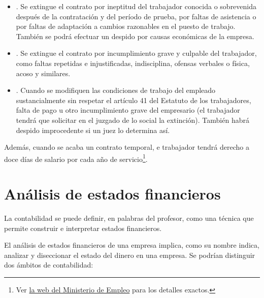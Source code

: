 \documentclass[nochap,palatino,shortheader]{apuntes}
\newcommand{\study}[1]{#1} \newcommand{\substudy}[1]{#1}
\begin{document}
\begin{itemize}
\item {}. Se extingue el contrato por ineptitud del trabajador conocida o sobrevenida después de la contratación y del período de prueba, por faltas de asistencia o por faltas de adaptación a cambios razonables en el puesto de trabajo. También se podrá efectuar un despido por causas económicas de la empresa.
\item {}. Se extingue el contrato por incumplimiento grave y culpable del trabajador, como faltas repetidas e injustificadas, indisciplina, ofensas verbales o física, acoso y similares.
\item {}. Cuando se modifiquen las condiciones de trabajo del empleado sustancialmente sin respetar el artículo 41 del Estatuto de los trabajadores, falta de pago u otro incumplimiento grave del empresario (el trabajador tendrá que solicitar en el juzgado de lo social la extinción). También habrá despido improcedente si un juez lo determina así.
\end{itemize}

Además, cuando se acaba un contrato temporal, e trabajador tendrá derecho a doce días de salario por cada año de servicio\footnote{Ver \href{http://www.empleo.gob.es/es/Guia/texto/guia_7/contenidos/guia_7_16_4.htm}{la web del Ministerio de Empleo} para los detalles exactos.}.

\section{Análisis de estados financieros}

\begin{defn}[Contabilidad]
La contabilidad se puede definir, en palabras del profesor, como una técnica que permite construir e interpretar estados financieros.
\end{defn}

El análisis de estados financieros de una empresa implica, como su nombre indica, \study{analizar y diseccionar el estado del dinero en una empresa}. Se podrían distinguir dos ámbitos de contabilidad:
\end{document}
